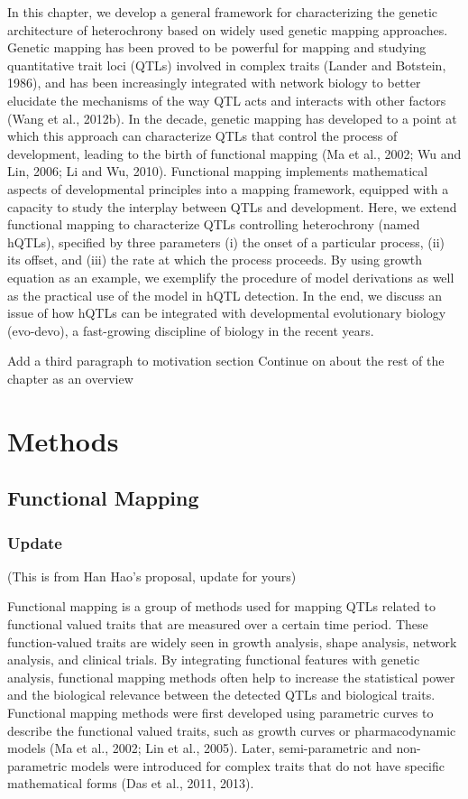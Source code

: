 \documentclass[]{book}
\theoremstyle{definition}
\theoremstyle{definition}
\theoremstyle{remark}
\begin{document}
In this chapter, we develop a general framework for characterizing the
genetic architecture of heterochrony based on widely used genetic
mapping approaches. Genetic mapping has been proved to be powerful for
mapping and studying quantitative trait loci (QTLs) involved in complex
traits (Lander and Botstein, 1986), and has been increasingly integrated
with network biology to better elucidate the mechanisms of the way QTL
acts and interacts with other factors (Wang et al., 2012b). In the
decade, genetic mapping has developed to a point at which this approach
can characterize QTLs that control the process of development, leading
to the birth of functional mapping (Ma et al., 2002; Wu and Lin, 2006;
Li and Wu, 2010). Functional mapping implements mathematical aspects of
developmental principles into a mapping framework, equipped with a
capacity to study the interplay between QTLs and development. Here, we
extend functional mapping to characterize QTLs controlling heterochrony
(named hQTLs), specified by three parameters (i) the onset of a
particular process, (ii) its offset, and (iii) the rate at which the
process proceeds. By using growth equation as an example, we exemplify
the procedure of model derivations as well as the practical use of the
model in hQTL detection. In the end, we discuss an issue of how hQTLs
can be integrated with developmental evolutionary biology (evo-devo), a
fast-growing discipline of biology in the recent years.

Add a third paragraph to motivation section Continue on about the rest
of the chapter as an overview

\section{Methods}\label{methods-2}

\subsection{Functional Mapping}\label{functional-mapping}

\subsubsection{Update}\label{update-1}

(This is from Han Hao's proposal, update for yours)

Functional mapping is a group of methods used for mapping QTLs related
to functional valued traits that are measured over a certain time
period. These function-valued traits are widely seen in growth analysis,
shape analysis, network analysis, and clinical trials. By integrating
functional features with genetic analysis, functional mapping methods
often help to increase the statistical power and the biological
relevance between the detected QTLs and biological traits. Functional
mapping methods were first developed using parametric curves to describe
the functional valued traits, such as growth curves or pharmacodynamic
models (Ma et al., 2002; Lin et al., 2005). Later, semi-parametric and
non-parametric models were introduced for complex traits that do not
have specific mathematical forms (Das et al., 2011, 2013).
\end{document}
